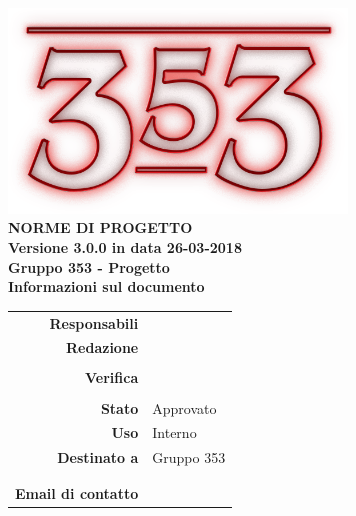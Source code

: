 \documentclass[openany, a4paper, 12pt]{report}
\begin{document}
\begin{titlepage}
	\centering
	\vfill
	{
		\bfseries
		\vskip2cm
		\includegraphics[width=9cm]{../../common/images/logo.png} \\
		\vfill
		\Huge{NORME DI PROGETTO}\\
		\vfill
		\Large Versione 3.0.0 in data 26-03-2018\\ 
		\large Gruppo 353 - Progetto \progetto \\
		\vfill
		\normalsize Informazioni sul documento\\
		\begin{table}[htbp]
			\centering
			\renewcommand\arraystretch{1.2}
			\begin{tabular}{r|l}
				\hline
				\textbf{Responsabili}	& \Mirco \\
								
														
				\textbf{Redazione} 		& \Gianluca \\
										& \Davide \\
										
				\textbf{Verifica} 		& \Riccardo \\
										& \Elena \\	
				
				\textbf{Stato} 			& Approvato \\
				\textbf{Uso}			& Interno \\
				\textbf{Destinato a}   	& Gruppo 353 \\
										& \Vardanega \\
										& \Cardin \\
				
				\textbf{Email di contatto}	& \mailgroup
			\end{tabular}
		\end{table}
		\vfill
	}    
\end{titlepage}

\tableofcontents
\newpage
{}




\appendix




 
\end{document}
